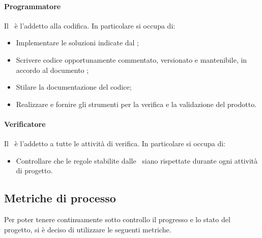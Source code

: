 \documentclass[../NormeDiProgetto.tex]{subfiles}
\begin{document}
				\paragraph{Programmatore\\}
					Il \programmatore\ è l'addetto alla codifica. In particolare si occupa di:
					\begin{itemize}
						\item Implementare le soluzioni indicate dal \progettista;
						\item Scrivere codice opportunamente commentato, versionato e mantenibile, in
						accordo al documento \normediprogetto;
						\item Stilare la documentazione del codice;
						\item Realizzare e fornire gli strumenti per la verifica e la validazione
						del prodotto.
					\end{itemize}
				\paragraph{Verificatore\\}
					Il \verificatore\ è l'addetto a tutte le attività di verifica.
					In particolare si occupa di:
					\begin{itemize}
						\item Controllare che le regole stabilite dalle \normediprogetto\ siano
						rispettate durante ogni attività di progetto.
					\end{itemize}
			\subsection{Metriche di processo}
				Per poter tenere continuamente sotto controllo il progresso e lo stato del progetto,
				si è deciso di utilizzare le seguenti metriche.
\end{document}
